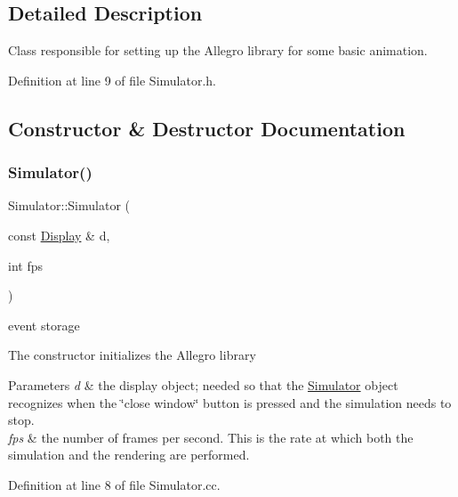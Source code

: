 \subsection{Detailed Description}
Class responsible for setting up the Allegro library for some basic animation. 

Definition at line 9 of file Simulator.\+h.



\subsection{Constructor \& Destructor Documentation}
\mbox{\label{class_simulator_ac76c0369824f7d70f0d6cb98859d0b1d}} 
\subsubsection{\texorpdfstring{Simulator()}{Simulator()}}
{\footnotesize\ttfamily Simulator\+::\+Simulator (\begin{DoxyParamCaption}\item[{const \mbox{\hyperlink{class_display}{Display}} \&}]{d,  }\item[{int}]{fps }\end{DoxyParamCaption})}



event storage 

The constructor initializes the Allegro library 
\begin{DoxyParams}{Parameters}
{\em d} & the display object; needed so that the \mbox{\hyperlink{class_simulator}{Simulator}} object recognizes when the \char`\"{}close window\char`\"{} button is pressed and the simulation needs to stop. \\
\hline
{\em fps} & the number of frames per second. This is the rate at which both the simulation and the rendering are performed. \\
\hline
\end{DoxyParams}


Definition at line 8 of file Simulator.\+cc.


